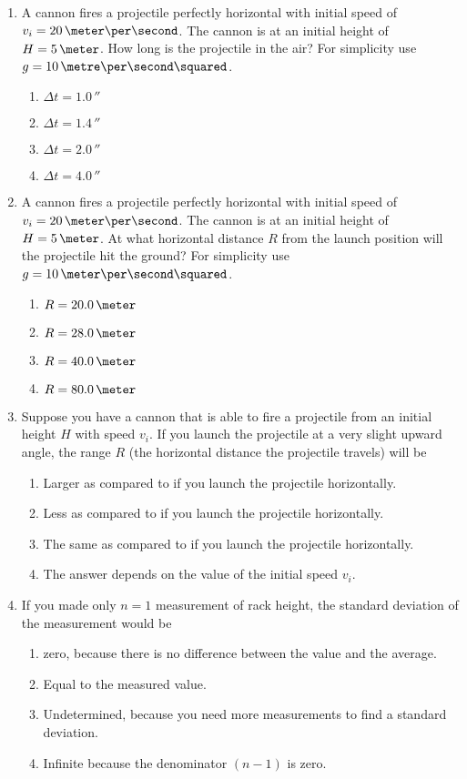 \begin{enumerate}
\item A cannon fires a projectile perfectly horizontal with initial speed of $v_i = 20\,\meter\per\second$. The cannon is at an initial height of $H = 5\,\meter$. How long is the projectile in the air? For simplicity use $g = 10\,\metre\per\second\squared$.
  \begin{enumerate}
  \item $\Delta t = 1.0\,\second$
  \item $\Delta t = 1.4\,\second$
  \item $\Delta t = 2.0\,\second$
  \item $\Delta t = 4.0\,\second$
  \end{enumerate}
\item A cannon fires a projectile perfectly horizontal with initial speed of $v_i = 20\,\meter\per\second$. The cannon is at an initial height of $H = 5\,\meter$. At what horizontal distance $R$ from the launch position will the projectile hit the ground? For simplicity use $g = 10\,\meter\per\second\squared$.
  \begin{enumerate}
  \item $R = 20.0\,\meter$
  \item $R = 28.0\,\meter$
  \item $R = 40.0\,\meter$
  \item $R = 80.0\,\meter$
  \end{enumerate}
\item Suppose you have a cannon that is able to fire a projectile from an initial height $H$ with speed $v_i$. If you launch the projectile at a very slight upward angle, the range $R$ (the horizontal distance the projectile travels) will be
  \begin{enumerate}
  \item Larger as compared to if you launch the projectile horizontally.
  \item Less as compared to if you launch the projectile horizontally.
  \item The same as compared to if you launch the projectile horizontally.
  \item The answer depends on the value of the initial speed $v_i$.
  \end{enumerate}
\item If you made only $n = 1$ measurement of rack height, the standard deviation of the measurement would be
  \begin{enumerate}
  \item zero, because there is no difference between the value and the average.
  \item Equal to the measured value.
  \item Undetermined, because you need more measurements to find a standard deviation.
  \item Infinite because the denominator $(n-1)$ is zero.
  \end{enumerate}
\end{enumerate}











